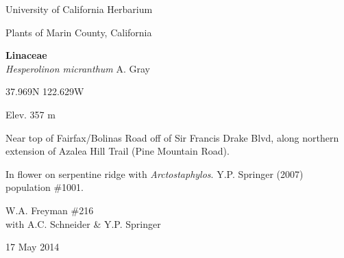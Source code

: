 \documentclass[letterpaper,10pt]{article}
\begin{document}
\begin{minipage}[t]{0.40\textwidth}

\begin{center}
University of California Herbarium \\
\begin{large}
Plants of Marin County, California \\
\end{large}
\vspace{\baselineskip}
\textbf{Linaceae} \\
\textit{Hesperolinon micranthum} A. Gray\\
\end{center}

\begin{footnotesize}

\begin{multicols}{2}
37.969\textdegree N 122.629\textdegree W
\columnbreak
\begin{flushright}
Elev. 357 m
\end{flushright}
\end{multicols}

Near top of Fairfax/Bolinas Road off of Sir Francis Drake Blvd, along northern extension of Azalea Hill Trail (Pine Mountain Road).
\vspace{\baselineskip}

In flower on serpentine ridge with \textit{Arctostaphylos}. Y.P. Springer (2007) population \#1001.

\begin{multicols}{2}
W.A. Freyman \#216 \\
with A.C. Schneider \& Y.P. Springer
\columnbreak
\begin{flushright}
17 May 2014
\end{flushright}
\end{multicols}

\end{footnotesize}

\end{minipage}
%
\hspace{2cm}
%
\end{document}
